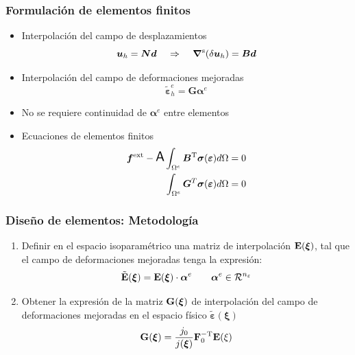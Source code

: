 \documentclass[handout]{beamer}
\begin{document}
\begin{frame}
\frametitle{Formulación de elementos finitos}
\begin{itemize}
\item Interpolación del campo de desplazamientos
$$\bm{u}_{h}={\bm N} {\bm d}\;\;\;\;\Rightarrow\;\;\;\;
\bm{\nabla}^{\rm s} (\delta \bm{u}_{h})=\bm{B} \bm{d}$$
\item Interpolación del campo de deformaciones mejoradas
$$
\tilde{\bm{\varepsilon}}_{h}^{e}=\bm{G}\bm{\alpha}^{e} 
$$
\item No se requiere continuidad de $\bm{\alpha}^{e}$ entre elementos
\item Ecuaciones de elementos finitos
\begin{align*}
\bm{f}^{\rm ext}- \mbox{\Large {\bf {\sf A}}} \int_{\Omega^{e}} \bm{B}^{\rm T} \bm{\sigma}
(\bm{\varepsilon}) d\Omega &=0\\
\int_{\Omega^{e}} \bm{G}^{T} \bm{\sigma}
(\bm{\varepsilon}) d\Omega &=0
\end{align*}
\end{itemize}
\end{frame}
\begin{frame}
\frametitle{Diseño de elementos: Metodología}
\begin{enumerate}
\item Definir en el espacio isoparamétrico una matriz de interpolación 
${\bf E}({\bm \xi})$, tal que el campo de deformaciones mejoradas tenga 
la expresión:
$$
{\tilde {\bf E}}({\bm \xi})={\bf E}({\bm \xi})\cdot {\bm \alpha}^{e}
\qquad {\bm \alpha}^{e} \in {\cal R}^{n_{\varepsilon}}
$$
\item Obtener la expresión de la matriz ${\bf G}({\bm \xi})$ de interpolación
del campo de deformaciones mejoradas en el espacio físico
${\tilde {\bm \varepsilon}}({\bm \xi})$
$$
{\bf G}({\bm \xi})=\frac{j_{0}}{j({\bm \xi})}{\bf F}_{0}^{-{\rm T}}
{\bf E}({\bf \xi}) 
$$
\end{enumerate}
\end{frame}
\end{document}

